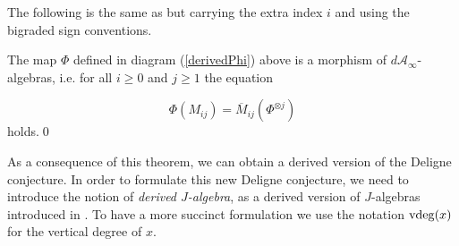 \documentclass[Thesis.tex]{subfiles}
\begin{document}
The following is the same as  but carrying the extra index $i$ and using the bigraded sign conventions.
\begin{thm}\label{bigradedtheorem}
The map $\Phi$ defined in diagram (\ref{derivedPhi}) above is a morphism of $d\mathcal{A}_\infty$-algebras, i.e. for all $i\geq 0$ and $j\geq 1$ the equation

\[\Phi(M_{ij})=\overline{M}_{ij}(\Phi^{\otimes j})\]
holds.\qed%
\end{thm}

As a consequence of this theorem, we can obtain a derived version of the Deligne conjecture. In order to formulate this new Deligne conjecture, we need to introduce the notion of \emph{derived $J$-algebra}, as a derived version of $J$-algebras introduced in . To have a more succinct formulation we use the notation $\mathrm{vdeg}(x)$ for the vertical degree of $x$.
\end{document}
